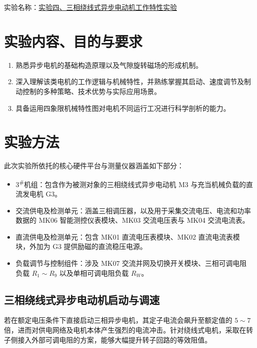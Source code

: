 	\vspace{0.5em}
	
	\begin{framed} 
		{\songti{}
			
			\begin{center}
				{\heiti{}
					{实验名称：\underline{\hspace{0.5em}实验四、三相绕线式异步电动机工作特性实验\hspace{0.5em}}}
				}
			\end{center}
			
			\section{实验内容、目的与要求}
			\begin{enumerate}
				\item 熟悉异步电机的基础构造原理以及气隙旋转磁场的形成机制。
				\item 深入理解该类电机的工作逻辑与机械特性，并熟练掌握其启动、速度调节及制动控制的多种策略、技术优势与实际应用场景。
				\item 具备运用四象限机械特性图对电机不同运行工况进行科学剖析的能力。
			\end{enumerate}
			
			\section{实验方法}
			此次实验所依托的核心硬件平台与测量仪器涵盖如下部分：
			\begin{itemize}
				\item 3\textsuperscript{\#}机组：包含作为被测对象的三相绕线式异步电动机 M3 与充当机械负载的直流发电机 G3。
				\item 交流供电及检测单元：涵盖三相调压器，以及用于采集交流电压、电流和功率数据的 MK06 智能测控仪表模块、MK03 交流电压表与 MK04 交流电流表。
				\item 直流供电及检测单元：包含 MK01 直流电压表模块、MK02 直流电流表模块，外加为 G3 提供励磁的直流稳压电源。
				\item 负载调节与控制组件：涉及 MK07 交流并网及切换开关模块、三相可调电阻负载 $R_1 \sim R_9$ 以及单相可调电阻负载 $R_W$。
			\end{itemize}
			
			\subsection{三相绕线式异步电动机启动与调速}
			若在额定电压条件下直接启动三相异步电机，其定子电流会飙升至额定值的 $5 \sim 7$ 倍，进而对供电网络及电机本体产生强烈的电流冲击。针对绕线式电机，采取在转子侧接入外部可调电阻的方案，能够大幅提升转子回路的等效阻值。
			
}
\end{framed}
